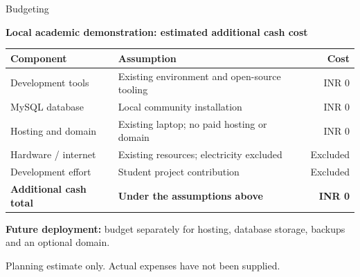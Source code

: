 \documentclass[aspectratio=169,11pt]{beamer}
\newcommand{\slidelead}[1]{\par{\color{HirePurple}\bfseries #1}\par\smallskip}
\begin{document}
\begin{frame}{Budgeting}
  \slidelead{Local academic demonstration: estimated additional cash cost}
  \small
  \renewcommand{\arraystretch}{1.35}
  \begin{tabularx}{\textwidth}{|L{.27\textwidth}|Y|r|}
    \hline
    \textbf{Component} & \textbf{Assumption} & \textbf{Cost}\\
    \hline
    Development tools & Existing environment and open-source tooling & INR 0\\
    \hline
    MySQL database & Local community installation & INR 0\\
    \hline
    Hosting and domain & Existing laptop; no paid hosting or domain & INR 0\\
    \hline
    Hardware / internet & Existing resources; electricity excluded & Excluded\\
    \hline
    Development effort & Student project contribution & Excluded\\
    \hline
    \textbf{Additional cash total} & \textbf{Under the assumptions above} & \textbf{INR 0}\\
    \hline
  \end{tabularx}\par
  \par\vspace{3mm}
  \textbf{Future deployment:} budget separately for hosting, database storage, backups and an optional domain.
  \par\vspace{2mm}
  {\footnotesize\color{HireMuted} Planning estimate only. Actual expenses have not been supplied.}
\end{frame}
\end{document}
